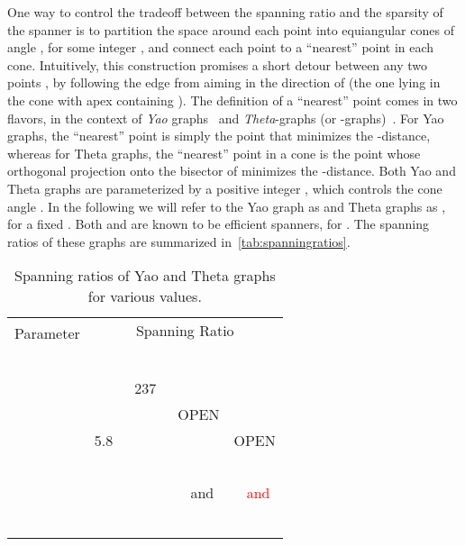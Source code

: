 \documentclass[runningheads,a4paper]{llncs}
\newcommand{\red}[1]{\textcolor{red}{#1}}
\begin{document}
One way to control the tradeoff between the spanning ratio and the sparsity of the spanner is to partition the space around each point into equiangular cones of angle , for some integer , and connect each point to a ``nearest'' point in each cone. Intuitively, this construction promises a short detour between any two points , by following the edge from  aiming in the direction of  (the one lying in the cone with apex  containing ). 
The definition of a ``nearest'' point comes in two flavors, in the context of \emph{Yao} graphs~\cite{Yao82} and \emph{Theta}-graphs (or -graphs)~\cite{Clark87,Keil88}. For Yao graphs, the ``nearest'' point is simply the point that minimizes the -distance, whereas for Theta graphs, the ``nearest'' point in a cone  is the point whose orthogonal projection onto the bisector of  minimizes the -distance.  Both Yao and Theta graphs are parameterized by a positive integer , which controls the cone angle . In the following we will refer to the Yao graph as  and Theta graphs as , for a fixed .  Both  and  are known to be efficient spanners, for . The spanning ratios of these graphs are summarized in~\autoref{tab:spanningratios}.


\begin{table}
\begin{center}
\begin{tabular} {|c|c|c|c|c|c|}
\hline
\multirow{2}{*}{Parameter } & \multicolumn{5}{|c|}{Spanning Ratio}  \\
\cline{2-6}
&  & \multicolumn{2}{|c|}{} &  &  \\
\hline \hline
\small{} & \multicolumn{5}{|c|}{\small{~\cite{MollaThesis09}}} \\
\hline
\small{} & \small{~\cite{BDD+10}} & \multicolumn{2}{|c|}{\small{237~\cite{BarbaBD13}}} & \multicolumn{2}{|c|}{\small{~\cite{DMP09}}} \\
\hline
\small{} & \small{~\cite{BarbaBD14}} & \multicolumn{2}{|c|}{\small{~\cite{BoseMRS14}}} &  
\small{OPEN} & \small{~\cite{KX13}} \\
\hline
\small{} & \small{5.8~\cite{BarbaBD14}}  & \multicolumn{2}{|c|}{\small{~\cite{BGH+10}}} & \small{~\cite{MollaThesis09}} & \small{OPEN} \\
\hline
\small{} & \multirow{3}{*}{~\small{\cite{BDDx10}}} & \multicolumn{2}{|c|}{~\small{\cite{RS91}} }
& \raisebox{-0.3em}{\small{~for}} & \raisebox{-0.3em}{\red{\small{~for}}} \\
\cline{1-1} \cline{3-4}
\small{} & & \small{} & \multirow{3}{*}{\small{\cite{BoseRV13,BoseCM+14}}} &  \small{~and} & \red{\small{~and}} \\
\cline{1-1} \cline{3-3}
\small{} & &  & &  \raisebox{0.3em}{\small{}} &  \raisebox{0.3em}{\red{\small{}}}  \\
\cline{1-3}
\small{} & ~\small{\cite{BarbaBD14}} &  & &  \raisebox{0.4em}{\small{\cite{DB13}}} & \raisebox{0.4em}{\small{\red{[HERE]}}} \\
\hline
\end{tabular}
\end{center}
\caption{Spanning ratios of Yao and Theta graphs for various  values.}
\label{tab:spanningratios}
\end{table}
\end{document}
